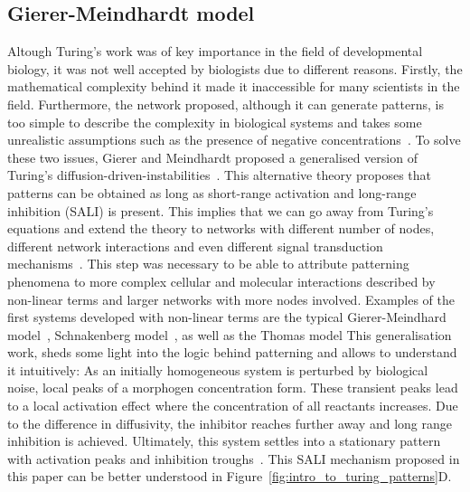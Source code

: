 \subsection{Gierer-Meindhardt model}
Altough Turing’s work was of key importance in the field of developmental biology, it was not well accepted by biologists due to different reasons.
Firstly, the mathematical complexity behind it made it inaccessible for many scientists in the field.
Furthermore, the network proposed, although it can generate patterns, is too simple to describe the complexity in biological systems and takes some unrealistic assumptions such as the presence of negative concentrations~\parencite{Kondo2010a}.
To solve these two issues, Gierer and Meindhardt proposed a generalised version of Turing’s diffusion-driven-instabilities~\parencite{Gierer1972}.
This alternative theory proposes that patterns can be obtained as long as short-range activation and long-range inhibition (SALI) is present.
This implies that we can go away from Turing’s equations and extend the theory to networks with different number of nodes, different network interactions and even different signal transduction mechanisms~\parencite{Murray1983, Rauch2004, Swindale1980}.
This step was necessary to be able to attribute patterning phenomena to more complex cellular and molecular interactions described by non-linear terms and larger networks with more nodes involved.
Examples of the first systems developed with non-linear terms are the typical Gierer-Meindhard model~\parencite{Gierer1972}, Schnakenberg model~\parencite{Schnakenberg1979}, as well as the Thomas model %
This generalisation work, sheds some light into the logic behind patterning and allows to understand it intuitively:
As an initially homogeneous system is perturbed by biological noise, local peaks of a morphogen concentration form.
These transient peaks lead to a local activation effect where the concentration of all reactants increases.
Due to the difference in diffusivity, the inhibitor reaches further away and long range inhibition is achieved.
Ultimately, this system settles into a stationary pattern with activation peaks and inhibition troughs~\parencite{Gierer1972}.
This SALI mechanism proposed in this paper can be better understood in Figure~\ref{fig:intro_to_turing_patterns}D.
